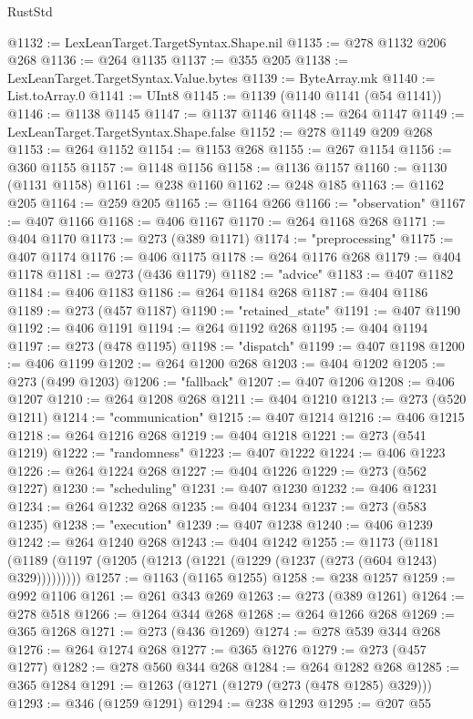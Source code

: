 \begin{lexlean}{RustStd}
\begin{coremodule}
{{{{{{{{{{{{{{{{{{{@1132 := LexLeanTarget.TargetSyntax.Shape.nil
@1135 := @278 @1132 @206 @268
@1136 := @264 @1135
@1137 := @355 @205
@1138 := LexLeanTarget.TargetSyntax.Value.bytes
@1139 := ByteArray.mk
@1140 := List.toArray.{0}
@1141 := UInt8
@1145 := @1139 (@1140 @1141 (@54 @1141))
@1146 := @1138 @1145
@1147 := @1137 @1146
@1148 := @264 @1147
@1149 := LexLeanTarget.TargetSyntax.Shape.false
@1152 := @278 @1149 @209 @268
@1153 := @264 @1152
@1154 := @1153 @268
@1155 := @267 @1154
@1156 := @360 @1155
@1157 := @1148 @1156
@1158 := @1136 @1157
@1160 := @1130 (@1131 @1158)
@1161 := @238 @1160
@1162 := @248 @185
@1163 := @1162 @205
@1164 := @259 @205
@1165 := @1164 @266
@1166 := "observation"
@1167 := @407 @1166
@1168 := @406 @1167
@1170 := @264 @1168 @268
@1171 := @404 @1170
@1173 := @273 (@389 @1171)
@1174 := "preprocessing"
@1175 := @407 @1174
@1176 := @406 @1175
@1178 := @264 @1176 @268
@1179 := @404 @1178
@1181 := @273 (@436 @1179)
@1182 := "advice"
@1183 := @407 @1182
@1184 := @406 @1183
@1186 := @264 @1184 @268
@1187 := @404 @1186
@1189 := @273 (@457 @1187)
@1190 := "retained_state"
@1191 := @407 @1190
@1192 := @406 @1191
@1194 := @264 @1192 @268
@1195 := @404 @1194
@1197 := @273 (@478 @1195)
@1198 := "dispatch"
@1199 := @407 @1198
@1200 := @406 @1199
@1202 := @264 @1200 @268
@1203 := @404 @1202
@1205 := @273 (@499 @1203)
@1206 := "fallback"
@1207 := @407 @1206
@1208 := @406 @1207
@1210 := @264 @1208 @268
@1211 := @404 @1210
@1213 := @273 (@520 @1211)
@1214 := "communication"
@1215 := @407 @1214
@1216 := @406 @1215
@1218 := @264 @1216 @268
@1219 := @404 @1218
@1221 := @273 (@541 @1219)
@1222 := "randomness"
@1223 := @407 @1222
@1224 := @406 @1223
@1226 := @264 @1224 @268
@1227 := @404 @1226
@1229 := @273 (@562 @1227)
@1230 := "scheduling"
@1231 := @407 @1230
@1232 := @406 @1231
@1234 := @264 @1232 @268
@1235 := @404 @1234
@1237 := @273 (@583 @1235)
@1238 := "execution"
@1239 := @407 @1238
@1240 := @406 @1239
@1242 := @264 @1240 @268
@1243 := @404 @1242
@1255 := @1173
    (@1181 (@1189 (@1197 (@1205 (@1213 (@1221 (@1229 (@1237 (@273 (@604 @1243) @329)))))))))
@1257 := @1163 (@1165 @1255)
@1258 := @238 @1257
@1259 := @992 @1106
@1261 := @261 @343 @269
@1263 := @273 (@389 @1261)
@1264 := @278 @518
@1266 := @1264 @344 @268
@1268 := @264 @1266 @268
@1269 := @365 @1268
@1271 := @273 (@436 @1269)
@1274 := @278 @539 @344 @268
@1276 := @264 @1274 @268
@1277 := @365 @1276
@1279 := @273 (@457 @1277)
@1282 := @278 @560 @344 @268
@1284 := @264 @1282 @268
@1285 := @365 @1284
@1291 := @1263 (@1271 (@1279 (@273 (@478 @1285) @329)))
@1293 := @346 (@1259 @1291)
@1294 := @238 @1293
@1295 := @207 @55
}}}}}}}}}}}}}}}}}}}
\end{coremodule}
\end{lexlean}
